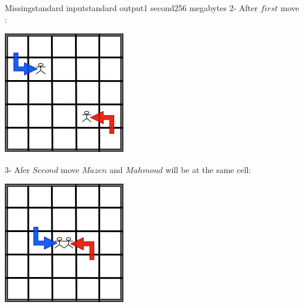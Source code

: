 \begin{problem}{Missing}{standard input}{standard output}{1 second}{256 megabytes}
2- After $first$ move$:$
\begin{center}
  \includegraphics[scale=1.5]{First_Move.drawio.png} \\
  \small{}
\end{center}

3- Afer $Second$ move $Mazen$ and $Mahmoud$ will be at the same cell:
\begin{center}
  \includegraphics[scale=1.5]{Second_Move.drawio.png} \\
  \small{}
\end{center}

\end{problem}

